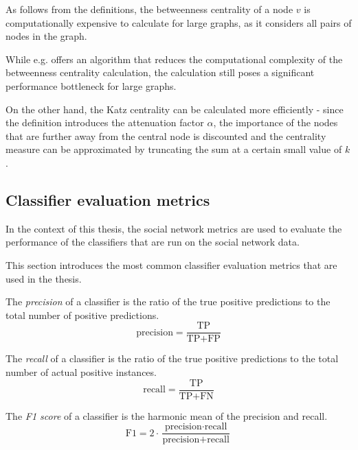 \begin{mybox}{}
As follows from the definitions, the betweenness centrality of a node $v$ is computationally expensive 
to calculate for large graphs, as it considers all pairs of nodes in the graph.

While e.g. \cite{brandes-faster-centrality} offers an algorithm that reduces the computational complexity of the betweenness centrality calculation,
the calculation still poses a significant performance bottleneck for large graphs.

On the other hand, the Katz centrality can be calculated more efficiently - since the definition introduces 
the attenuation factor $\alpha$, the importance of the nodes that are further away from the central node is discounted
and the centrality measure can be approximated by truncating the sum at a certain small value of $k$.
\end{mybox}

\subsection{Classifier evaluation metrics}

In the context of this thesis, the social network metrics are used to evaluate 
the performance of the classifiers that are run on the social network data.

This section introduces the most common classifier evaluation metrics that are used in the thesis.

\begin{definition}[Precision]
    The \textit{precision} of a classifier is the ratio of the true positive predictions to the total number of positive predictions.
    $$
    \text{precision} = \frac{\text{TP}}{\text{TP} + \text{FP}}
    $$
\end{definition}

\begin{definition}[Recall]
    The \textit{recall} of a classifier is the ratio of the true positive predictions to the total number of actual positive instances.
    $$
    \text{recall} = \frac{\text{TP}}{\text{TP} + \text{FN}}
    $$
\end{definition}

\begin{definition}[F1 score]
    The \textit{F1 score} of a classifier is the harmonic mean of the precision and recall.
    $$
    \text{F1} = 2 \cdot \frac{\text{precision} \cdot \text{recall}}{\text{precision} + \text{recall}}
    $$
\end{definition}

